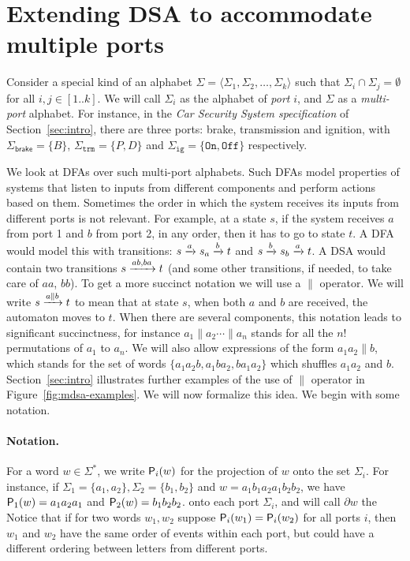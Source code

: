 \section{Extending DSA to accommodate multiple ports}
\label{sec:multiport}

Consider a special kind of an alphabet
$\Sigma = \langle \Sigma_1, \Sigma_2, \dots, \Sigma_k \rangle$ such
that $\Sigma_i \cap \Sigma_j = \emptyset$ for all $i, j \in
[1..k]$. We will call $\Sigma_i$ as the alphabet of \emph{port} $i$,
and $\Sigma$ as a \emph{multi-port} alphabet. For instance, in the \emph{Car Security System specification} of Section~\ref{sec:intro}, there are three ports: brake, transmission and ignition, with $\Sigma_{\mathsf{brake}} = \{B\}$, $\Sigma_{\mathtt{trm}} = \{ P, D\}$ and $\Sigma_{\mathtt{ig}} = \{ \mathtt{On}, \mathtt{Off} \}$ respectively.  

We look at DFAs over such multi-port alphabets. Such DFAs model properties of systems 
that listen to inputs from different components and perform actions
based on them. Sometimes the order in which the system receives its
inputs from different ports is not relevant. For example, at a state
$s$, if the system receives $a$ from port 1 and $b$ from port 2, in any
order, then it has to go to state $t$.  A DFA would model this with
transitions: $s \xrightarrow{a} s_a \xrightarrow{b} t$ and $s \xrightarrow{b} s_b \xrightarrow{a}
t$. A DSA would contain two transitions $s \xrightarrow{ab, ba} t$ (and some
other transitions, if needed, to take care of $aa$, $bb$). To get a
more succinct notation we will use a $\parallel$ operator. We will
write $s \xrightarrow{a \parallel b} t$ to mean that at state $s$, when
both $a$ and $b$ are received, the automaton moves to $t$. When there
are several components, this notation leads to significant
succinctness, for instance $a_1 \parallel a_2 \cdots \parallel a_n$
stands for all the $n!$ permutations of $a_1$ to $a_n$. We will also
allow expressions of the form $a_1 a_2 \parallel b$, which stands for
the set of words $\{a_1 a_2 b, a_1 b a_2, b a_1 a_2\}$ which shuffles
$a_1a_2$ and $b$. Section~\ref{sec:intro} illustrates further examples of the use of $\parallel$ operator in Figure~\ref{fig:mdsa-examples}. We will now formalize this idea.  We begin with some notation.%

\paragraph*{Notation.} For a word $w \in \Sigma^*$, we write
$\mathsf{P}_{i}(w)$ for the projection of $w$ onto the set $\Sigma_i$. For
instance, if $\Sigma_1 = \{a_1, a_2\}, \Sigma_2 = \{b_1, b_2\}$ and
$w = a_1 b_1 a_2 a_1 b_2 b_2$, we have $\mathsf{P}_{1}(w) = a_1 a_2 a_1$ and
$\mathsf{P}_{2}(w) = b_1 b_2 b_2$.  %
onto each port $\Sigma_i$, and will call $\partial w$ the
Notice that if for two words $w_1, w_2$ suppose $\mathsf{P}_{i}(w_1) = \mathsf{P}_{i}(w_2)$ for all ports $i$, then $w_1$ and $w_2$ have the same order of events within each port, but could have a different ordering between letters from different ports.%


